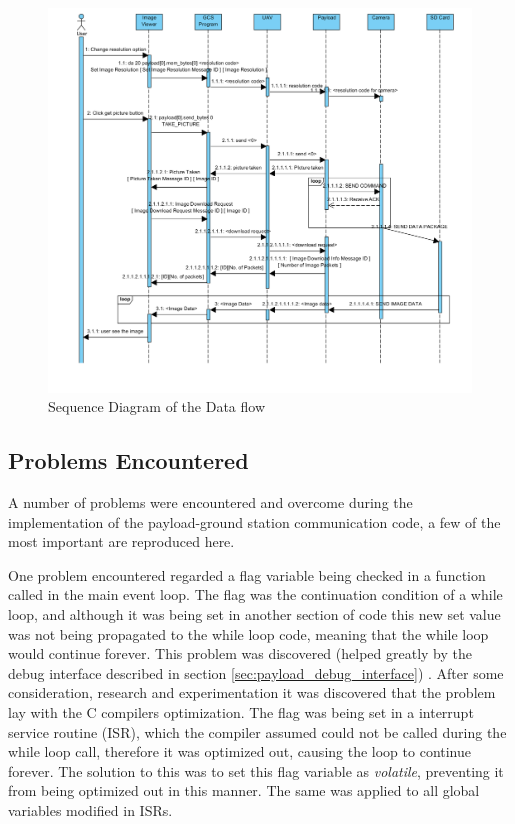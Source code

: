 \begin{figure}[H]
\begin{center}
\includegraphics[width=1.00\textwidth]{figures/sequence_diagram.png} 
\end{center}
\caption{Sequence Diagram of the Data flow\label{sequence diagram}}
\end{figure}


\subsection{Problems Encountered}
A number of problems were encountered and overcome during the implementation of the payload-ground station
communication code, a few of the most important are reproduced here.

One problem encountered regarded a flag variable being checked in a function called in the main event loop. The flag
was the continuation condition of a while loop, and although it was being set in another section of code this new set 
value was not being propagated to the while loop code, meaning that the while loop would continue forever. This problem
was discovered (helped greatly by the debug interface described in section \ref{sec:payload_debug_interface}) . After some
consideration, research and experimentation it was discovered that the problem lay with the C compilers optimization. The 
flag was being set in a interrupt service routine (ISR), which the compiler assumed could not be called during the while loop
call, therefore it was optimized out, causing the loop to continue forever. The solution to this was to set this flag variable 
as \emph{volatile}, preventing it from being optimized out in this manner. The same was applied to all global variables modified in ISRs.




